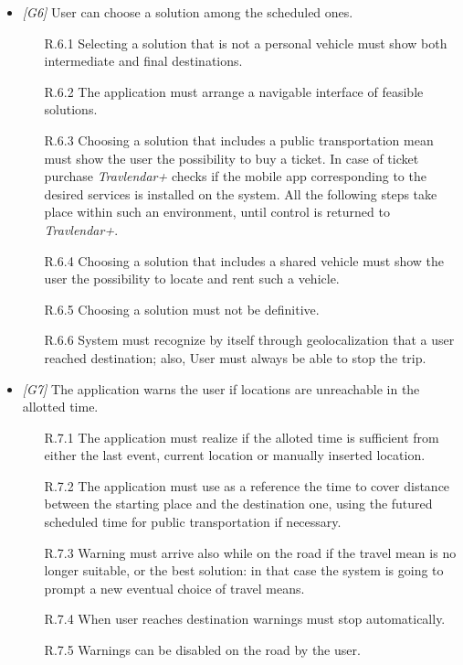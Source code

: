 \begin{itemize}
\begin{itemize}
		\end{itemize}
                  
                  
	\item \textit{[G6]} User can choose a solution among the scheduled ones. 
		\begin{itemize}
			\item [R.6.1] Selecting a solution that is not a personal vehicle must show both intermediate and final destinations.
			\item [R.6.2] The application must arrange a navigable interface of feasible solutions.
			\item [R.6.3] Choosing a solution that includes a public transportation mean must show the user the possibility to buy a ticket. In case of ticket purchase \textit{Travlendar+} checks if the mobile app corresponding to the desired services is installed on the system. All the following steps take place within such an environment, until control is returned to \textit{Travlendar+}.

			\item [R.6.4] Choosing a solution that includes a shared vehicle must show the user the possibility to locate and rent such a vehicle.
			\item [R.6.5] Choosing a solution must not be definitive.
			\item [R.6.6] System must recognize by itself through geolocalization that a user reached destination; also, User must always be able to stop the trip.
		\end{itemize}
                  
                  
	\item \textit{[G7]} The application warns the user if locations are unreachable in the allotted time.
		\begin{itemize}
			\item[R.7.1] The application must realize if the alloted time is sufficient from either the last event, current location or manually inserted location.
			\item[R.7.2] The application must use as a reference the time to cover distance between the starting place and the destination one, using the futured scheduled time for public transportation if necessary.
			\item [R.7.3] Warning must arrive also while on the road if the travel mean is no longer suitable, or the best solution: in that case the system is going to prompt a new eventual choice of travel means.
			\item [R.7.4] When user reaches destination warnings must stop automatically.
			\item [R.7.5] Warnings can be disabled on the road by the user.
		\end{itemize}



\end{itemize}
